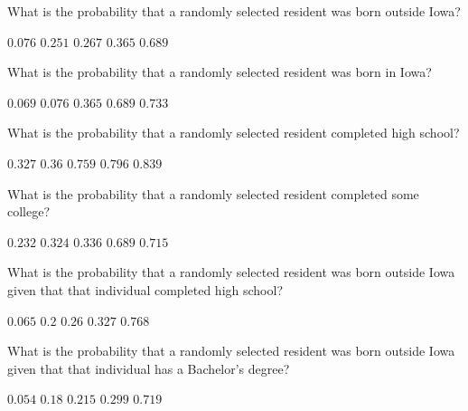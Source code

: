 \documentclass[answers,12pt]{exam}
\begin{document}
\begin{questions}

\question\label{FirstIowa} What is the probability that a randomly selected
resident was born outside Iowa?\\
\begin{oneparchoices}
\choice $0.076$ %
\correctchoice $0.251$
\choice $0.267$ %
\choice $0.365$ %
\choice $0.689$ %
\end{oneparchoices}

\question What is the probability that a randomly selected
resident was born in Iowa?\\
\begin{oneparchoices}
\choice $0.069$ %
\choice $0.076$ %
\choice $0.365$ %
\correctchoice $0.689$
\choice $0.733$ %
\end{oneparchoices}

\question What is the probability that a randomly selected
resident completed high school?\\
\begin{oneparchoices}
\correctchoice $0.327$
\choice $0.36$ %
\choice $0.759$ %
\choice $0.796$ %
\choice $0.839$ %
\end{oneparchoices}

\question What is the probability that a randomly selected
resident completed some college?\\
\begin{oneparchoices}
\choice $0.232$ %
\correctchoice $0.324$
\choice $0.336$ %
\choice $0.689$ %
\choice $0.715$ %
\end{oneparchoices}

\question What is the probability that a randomly selected
resident was born outside Iowa given that
that individual completed high school?\\
\begin{oneparchoices}
\choice $0.065$ %
\correctchoice $0.2$
\choice $0.26$ %
\choice $0.327$ %
\choice $0.768$ %
\end{oneparchoices}

\question What is the probability that a randomly selected
resident was born outside Iowa given that
that individual has a Bachelor's degree?\\
\begin{oneparchoices}
\choice $0.054$ %
\choice $0.18$ %
\choice $0.215$ %
\correctchoice $0.299$
\choice $0.719$ %
\end{oneparchoices}


\end{questions}
\end{document}
